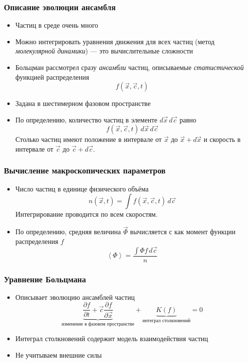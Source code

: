 \documentclass[onlymath]{beamer}
\newcommand\avg[1]{\left\langle{#1}\right\rangle}
\newcommand{\pardiff}[2]{\frac{\partial{#1}}{\partial{#2}}}
\begin{document}
\begin{frame}
  \frametitle{Описание эволюции ансамбля}
  \begin{itemize}
  \item Частиц в среде очень много
  \item Можно интегрировать уравнения движения для всех частиц (метод
    \emph{молекулярной динамики}) — это вычислительные сложности
  \item Больцман рассмотрел сразу \emph{ансамбли} частиц, описываемые
    \emph{статистической} функцией распределения
    \begin{equation*}
      f(\vec{x}, \vec{c}, t)
    \end{equation*}
  \item Задана в шестимерном фазовом пространстве
  \item По определению, количество частиц в элементе $d\vec{x}\,
    d\vec{c}$ равно
    \begin{equation*}
      f(\vec{x}, \vec{c}, t) \,d\vec{x}\, d\vec{c}
    \end{equation*}
    Столько частиц имеют положение в интервале от $\vec{x}$ до
    $\vec{x}+d\vec{x}$ и скорость в интервале от $\vec{c}$ до
    $\vec{c}+d\vec{c}$.
  \end{itemize}
\end{frame}

\begin{frame}
  \frametitle{Вычисление макроскопических параметров}
  \begin{itemize}
  \item Число частиц в единице физического объёма
    \begin{equation*}
      n(\vec{x}, t) = \int f(\vec{x}, \vec{c}, t)\,d\vec{c}
    \end{equation*}
    Интегрирование проводится по всем скоростям.
  \item По определению, средняя величина $\vec{\Phi}$ вычисляется с
    как момент функции распределения $f$
    \begin{equation*}
      \avg{\Phi} = \frac{\int{\Phi f \,d\vec{c}}}{n}
    \end{equation*}
  \end{itemize}
\end{frame}

\begin{frame}
  \frametitle{Уравнение Больцмана}
  \begin{itemize}
  \item Описывает эволюцию ансамблей частиц
    \begin{equation*}
      \underbrace{\pardiff{f}{t} +
        \vec{c} \pardiff{f}{\vec{x}}}_{\text{изменение в фазовом
          пространстве}} +
      \underbrace{K(f)}_{\text{интеграл столкновений}} = 0
    \end{equation*}
  \item Интеграл столкновений содержит модель взаимодействия частиц
  \item Не учитываем внешние силы
  \end{itemize}
\end{frame}
\end{document}
